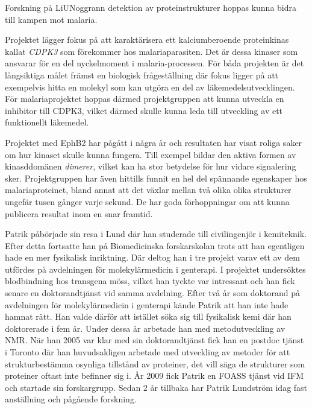 \begin{news}{3}{Forskning på LiU}{Noggrann detektion av proteinstrukturer hoppas kunna bidra till kampen mot malaria.}{}{}


Projektet lägger fokus på att karaktärisera ett kalciumberoende proteinkinas kallat \emph{CDPK3} som förekommer hos malariaparasiten. Det är dessa kinaser som ansvarar för en del nyckelmoment i malaria-processen. 
För båda projekten är det långsiktiga målet främst en biologisk frågeställning där fokus ligger på att exempelvis hitta en molekyl som kan utgöra en del av läkemedelsutvecklingen. För malariaprojektet hoppas därmed projektgruppen att kunna utveckla en inhibitor till CDPK3, vilket därmed skulle kunna leda till utveckling av ett funktionellt läkemedel.

Projektet med EphB2 har pågått i några år och resultaten har visat roliga saker om hur kinaset skulle kunna fungera. Till exempel bildar den aktiva formen av kinasddomänen \emph{dimerer}, vilket kan ha stor betydelse för hur vidare signalering sker. Projektgruppen har även hittills funnit en hel del spännande egenskaper hos malariaproteinet, bland annat att det växlar mellan två olika olika strukturer ungefär tusen gånger varje sekund. De har goda förhoppningar om att kunna publicera resultat inom en snar framtid.

Patrik påbörjade sin resa i Lund där han studerade till civilingenjör i kemiteknik. Efter detta fortsatte han på Biomedicinska forskarskolan trots att han egentligen hade en mer fysikalisk inriktning. Där deltog han i tre projekt varav ett av dem utfördes på avdelningen för molekylärmedicin i genterapi. I projektet undersöktes blodbindning hos transgena möss, vilket han tyckte var intressant och han fick senare en doktorandtjänst vid samma avdelning. Efter två år som doktorand på avdelningen för molekylärmedicin i genterapi kände Patrik att han inte hade hamnat rätt. Han valde därför att istället söka sig till fysikalisk kemi där han doktorerade i fem år. Under dessa år arbetade han med metodutveckling av NMR. När han 2005 var klar med sin doktorandtjänst fick han en postdoc tjänst i Toronto där han huvudsakligen arbetade med utveckling av metoder för att strukturbestämma osynliga tillstånd av proteiner, det vill säga de strukturer som proteiner oftast inte befinner sig i. År 2009 fick Patrik en FOASS tjänst vid IFM och startade sin forskargrupp. Sedan 2 år tillbaka har Patrik Lundström idag fast anställning och pågående forskning.

\end{news}